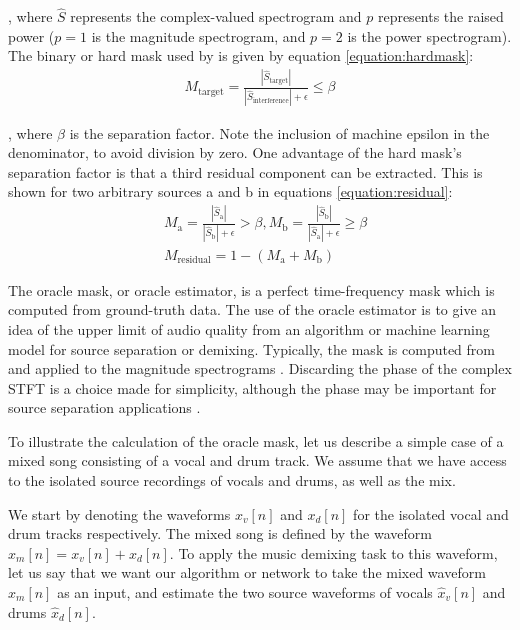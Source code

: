 \documentclass[report.tex]{subfiles}
\begin{document}
, where $\hat{S}$ represents the complex-valued spectrogram and $p$ represents the raised power ($p = 1$ is the magnitude spectrogram, and $p = 2$ is the power spectrogram). The binary or hard mask used by \textcite{driedger} is given by equation \eqref{equation:hardmask}:
\begin{align}
	M_{\text{target}} = \frac{|\hat{S}_{\text{target}}|}{|\hat{S}_{\text{interference}}| + \epsilon} \le \beta\tag{17}\label{equation:hardmask}
\end{align}

, where $\beta$ is the separation factor. Note the inclusion of machine epsilon in the denominator, to avoid division by zero. One advantage of the hard mask's separation factor is that a third residual component can be extracted. This is shown for two arbitrary sources a and b in equations \eqref{equation:residual}:
\begin{align}\tag{18}\label{equation:residual}
	\nonumber & M_{\text{a}} = \frac{|\hat{S}_{\text{a}}|}{|\hat{S}_{\text{b}}| + \epsilon} > \beta, M_{\text{b}} = \frac{|\hat{S}_{\text{b}}|}{|\hat{S}_{\text{a}}| + \epsilon} \ge \beta\\
	\nonumber & M_{\text{residual}} = 1 - (M_{\text{a}} + M_{\text{b}})
\end{align}

The oracle mask, or oracle estimator, is a perfect time-frequency mask which is computed from ground-truth data. The use of the oracle estimator is to give an idea of the upper limit of audio quality from an algorithm or machine learning model for source separation or demixing. Typically, the mask is computed from and applied to the magnitude spectrograms \parencite{fitzgerald1, fitzgerald2, driedger, umx, plumbley1, plumbley2}. Discarding the phase of the complex STFT is a choice made for simplicity, although the phase may be important for source separation applications \parencite{ditchphase}.

To illustrate the calculation of the oracle mask, let us describe a simple case of a mixed song consisting of a vocal and drum track. We assume that we have access to the isolated source recordings of vocals and drums, as well as the mix.

We start by denoting the waveforms $x_{v}[n]$ and $x_{d}[n]$ for the isolated vocal and drum tracks respectively. The mixed song is defined by the waveform $x_{m}[n] = x_{v}[n] + x_{d}[n]$. To apply the music demixing task to this waveform, let us say that we want our algorithm or network to take the mixed waveform $x_{m}[n]$ as an input, and estimate the two source waveforms of vocals $\hat{x}_{v}[n]$ and drums $\hat{x}_{d}[n]$.
\end{document}
